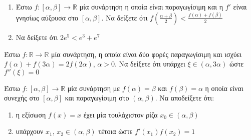 \documentclass{presentation}
\begin{document}
\begin{askisi}
    \begin{enumerate}
        \item<1-> Έστω $f:[α,β]\to\mathbb{R}$ μία συνάρτηση η οποία είναι παραγωγίσιμη και η $f'$ είναι γνησίως αύξουσα στο $[α,β]$. Να δείξετε ότι $f\left( \frac{α+β}{2} \right)<\frac{f(α)+f(β)}{2} $
        \item<2-> Να δείξετε ότι $2e^5<e^3+e^7$
    \end{enumerate}

\end{askisi}

\begin{askisi}
    Έστω $f:\mathbb{R}\to\mathbb{R}$ μία συνάρτηση, η οποία είναι δύο φορές παραγωγίσιμη και ισχύει $f(α)+f(3α)=2f(2α)$, $α>0$. Να δείξετε ότι υπάρχει $ξ\in (α,3α)$ ώστε $f''(ξ)=0$

\end{askisi}

\begin{askisi}
    Έστω $f:[α,β]\to\mathbb{R}$ μία συνάρτηση με $f(α)=β$ και $f(β)=α$ η οποία είναι συνεχής στο $[α,β]$ και παραγωγίσιμη στο $(α,β)$. Να αποδείξετε ότι:
    \begin{enumerate}
        \item<1-> η εξίσωση $f(x)=x$ έχει μία τουλάχιστον ρίζα $x_0\in (α,β)$
        \item<2-> υπάρχουν $x_1$, $x_2\in (α,β)$ τέτοια ώστε $f'(x_1)f(x_2)=1$
    \end{enumerate}

\end{askisi}
\end{document}
